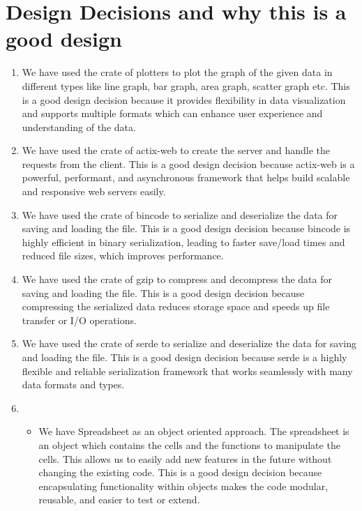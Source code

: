 \documentclass[10pt,a4paper]{article}  %
\begin{document}
\section{Design Decisions and why this is a good design}
\begin{enumerate}
    \item We have used the crate of plotters to plot the graph of the given data in different types like line graph, bar graph, area graph, scatter graph etc.  
    This is a good design decision because it provides flexibility in data visualization and supports multiple formats which can enhance user experience and understanding of the data.

    \item We have used the crate of actix-web to create the server and handle the requests from the client.  
    This is a good design decision because actix-web is a powerful, performant, and asynchronous framework that helps build scalable and responsive web servers easily.

    \item We have used the crate of bincode to serialize and deserialize the data for saving and loading the file.  
    This is a good design decision because bincode is highly efficient in binary serialization, leading to faster save/load times and reduced file sizes, which improves performance.

    \item We have used the crate of gzip to compress and decompress the data for saving and loading the file.  
    This is a good design decision because compressing the serialized data reduces storage space and speeds up file transfer or I/O operations.

    \item We have used the crate of serde to serialize and deserialize the data for saving and loading the file.  
    This is a good design decision because serde is a highly flexible and reliable serialization framework that works seamlessly with many data formats and types.

    \item 
    \begin{itemize}
        \item We have Spreadsheet as an object oriented approach. The spreadsheet is an object which contains the cells and the functions to manipulate the cells. This allows us to easily add new features in the future without changing the existing code.  
        This is a good design decision because encapsulating functionality within objects makes the code modular, reusable, and easier to test or extend.


\end{itemize}
\end{enumerate}
\end{document}
